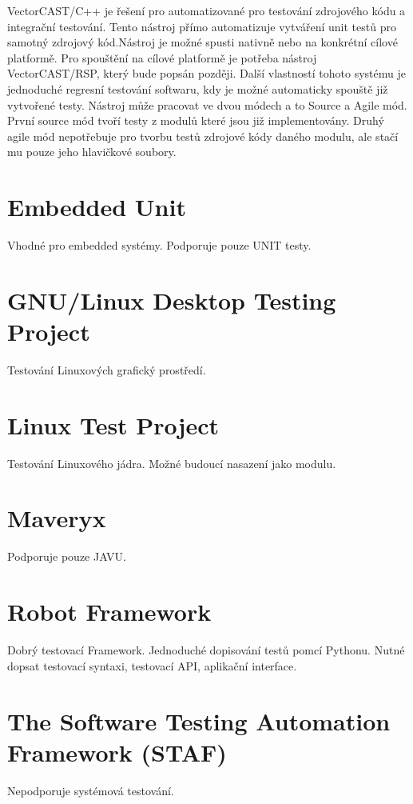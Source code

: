 VectorCAST/C++ je řešení pro automatizované pro testování zdrojového kódu a integrační testování. Tento nástroj přímo automatizuje vytváření unit testů pro samotný zdrojový kód.Nástroj je možné spusti nativně nebo na konkrétní cílové platformě. Pro spouštění na cílové platformě je potřeba nástroj VectorCAST/RSP, který bude popsán později. Další vlastností tohoto systému je jednoduché regresní testování softwaru, kdy je možné automaticky spouště již vytvořené testy. Nástroj může pracovat ve dvou módech a to Source a Agile mód. První source mód tvoří testy z modulů které jsou již implementovány. Druhý agile mód nepotřebuje pro tvorbu testů zdrojové kódy daného modulu, ale stačí mu pouze jeho hlavičkové soubory.



\section{Embedded Unit}
Vhodné pro embedded systémy.
Podporuje pouze UNIT testy.



\section{GNU/Linux Desktop Testing Project}
Testování Linuxových grafický prostředí.

\section{Linux Test Project}
Testování Linuxového jádra.
Možné budoucí nasazení jako modulu.


\section{Maveryx}
Podporuje pouze JAVU.


\section{Robot Framework}
Dobrý testovací Framework.
Jednoduché dopisování testů pomcí Pythonu.
Nutné dopsat testovací syntaxi, testovací API, aplikační interface.


\section{The Software Testing Automation Framework (STAF)}
Nepodporuje systémová testování.






\endinput
